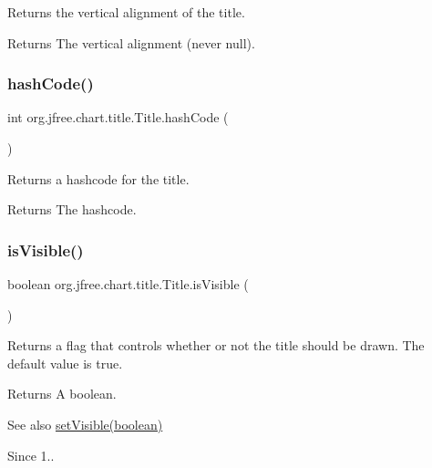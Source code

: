 Returns the vertical alignment of the title.

\begin{DoxyReturn}{Returns}
The vertical alignment (never {\ttfamily null}). 
\end{DoxyReturn}
\mbox{\label{classorg_1_1jfree_1_1chart_1_1title_1_1_title_af469f5e9ec0f7430ad2426b7c5fd61cb}} 
\subsubsection{\texorpdfstring{hash\+Code()}{hashCode()}}
{\footnotesize\ttfamily int org.\+jfree.\+chart.\+title.\+Title.\+hash\+Code (\begin{DoxyParamCaption}{ }\end{DoxyParamCaption})}

Returns a hashcode for the title.

\begin{DoxyReturn}{Returns}
The hashcode. 
\end{DoxyReturn}
\mbox{\label{classorg_1_1jfree_1_1chart_1_1title_1_1_title_aab346ae505ab18ec0580d93d3b59fcea}} 
\subsubsection{\texorpdfstring{is\+Visible()}{isVisible()}}
{\footnotesize\ttfamily boolean org.\+jfree.\+chart.\+title.\+Title.\+is\+Visible (\begin{DoxyParamCaption}{ }\end{DoxyParamCaption})}

Returns a flag that controls whether or not the title should be drawn. The default value is {\ttfamily true}.

\begin{DoxyReturn}{Returns}
A boolean.
\end{DoxyReturn}
\begin{DoxySeeAlso}{See also}
\mbox{\hyperlink{classorg_1_1jfree_1_1chart_1_1title_1_1_title_a03df402dfe058a11ab83af3e158a5e2a}{set\+Visible(boolean)}}
\end{DoxySeeAlso}
\begin{DoxySince}{Since}
1.. 
\end{DoxySince}
\mbox{\label{classorg_1_1jfree_1_1chart_1_1title_1_1_title_ae3a002f59bc7104b5847702b6ea1ec7d}} 
